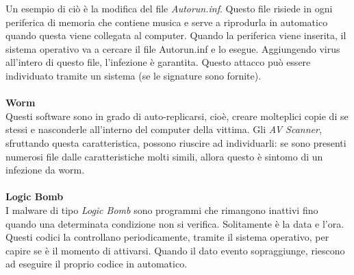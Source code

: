 Un esempio di ciò è la modifica del file \textit{Autorun.inf}. Questo file risiede in ogni periferica di memoria che contiene musica e serve a riprodurla in automatico quando questa viene collegata al computer. Quando la periferica viene inserita, il sistema operativo va a cercare il file Autorun.inf e lo esegue. Aggiungendo virus all'intero di questo file, l'infezione è garantita. Questo attacco può essere individuato tramite un sistema  (se le signature sono fornite).\\
\\
\textbf{Worm}\\
Questi software sono in grado di auto-replicarsi, cioè, creare molteplici copie di se stessi e nasconderle all'interno del computer della vittima. Gli \textit{AV Scanner}, sfruttando questa caratteristica, possono riuscire ad individuarli: se sono presenti numerosi file dalle caratteristiche molti simili, allora questo è sintomo di un infezione da worm.\\
\\
\textbf{Logic Bomb}\\
I malware di tipo \textit{Logic Bomb} sono programmi che rimangono inattivi fino quando una determinata condizione non si verifica. Solitamente è la data e l'ora. Questi codici la controllano periodicamente, tramite il sistema operativo, per capire se è il momento di attivarsi. Quando il dato evento sopraggiunge, riescono ad eseguire il proprio codice in automatico.